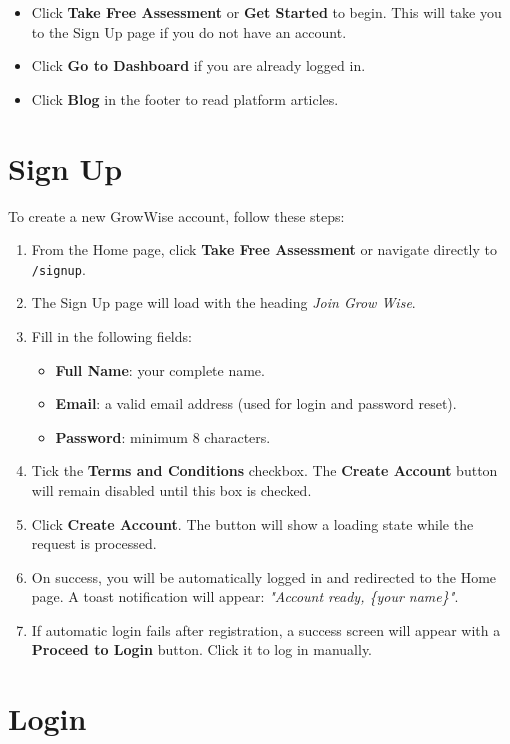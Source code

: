\documentclass{FastFyp}
\begin{document}
\begin{itemize}
    \item Click \textbf{Take Free Assessment} or \textbf{Get Started} to begin. This will take you to the Sign Up page if you do not have an account.
    \item Click \textbf{Go to Dashboard} if you are already logged in.
    \item Click \textbf{Blog} in the footer to read platform articles.
\end{itemize}

\section{Sign Up}

To create a new GrowWise account, follow these steps:

\begin{enumerate}
    \item From the Home page, click \textbf{Take Free Assessment} or navigate directly to \texttt{/signup}.
    \item The Sign Up page will load with the heading \textit{Join Grow Wise}.
    \item Fill in the following fields:
        \begin{itemize}
            \item \textbf{Full Name}: your complete name.
            \item \textbf{Email}: a valid email address (used for login and password reset).
            \item \textbf{Password}: minimum 8 characters.
        \end{itemize}
    \item Tick the \textbf{Terms and Conditions} checkbox. The \textbf{Create Account} button will remain disabled until this box is checked.
    \item Click \textbf{Create Account}. The button will show a loading state while the request is processed.
    \item On success, you will be automatically logged in and redirected to the Home page. A toast notification will appear: \textit{"Account ready, \{your name\}"}.
    \item If automatic login fails after registration, a success screen will appear with a \textbf{Proceed to Login} button. Click it to log in manually.
\end{enumerate}

\section{Login}
\end{document}
